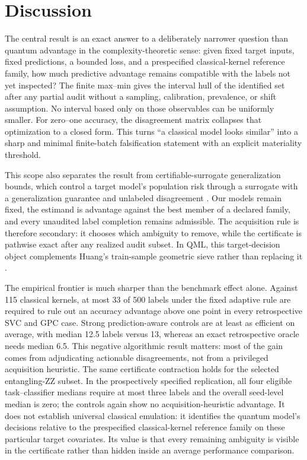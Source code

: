 \documentclass[referee,lineno,pdflatex,sn-nature]{sn-jnl}
\theoremstyle{thmstyleone}%
\theoremstyle{thmstyletwo}%
\theoremstyle{thmstylethree}%
\begin{document}
\section{Discussion}
\label{sec:discussion}

The central result is an exact answer to a deliberately narrower question than quantum advantage in the complexity-theoretic sense: given fixed target inputs, fixed predictions, a bounded loss, and a prespecified classical-kernel reference family, how much predictive advantage remains compatible with the labels not yet inspected? The finite max--min gives the interval hull of the identified set after any partial audit without a sampling, calibration, prevalence, or shift assumption. No interval based only on those observables can be uniformly smaller. For zero--one accuracy, the disagreement matrix collapses that optimization to a closed form. This turns ``a classical model looks similar'' into a sharp and minimal finite-batch falsification statement with an explicit materiality threshold.

This scope also separates the result from certifiable-surrogate generalization bounds, which control a target model's population risk through a surrogate with a generalization guarantee and unlabeled disagreement \cite{bazinet2026bound}. Our models remain fixed, the estimand is advantage against the best member of a declared family, and every unaudited label completion remains admissible. The acquisition rule is therefore secondary: it chooses which ambiguity to remove, while the certificate is pathwise exact after any realized audit subset. In QML, this target-decision object complements Huang's train-sample geometric sieve rather than replacing it \cite{huang2021powerofdata}.

The empirical frontier is much sharper than the benchmark effect alone. Against 115 classical kernels, at most 33 of 500 labels under the fixed adaptive rule are required to rule out an accuracy advantage above one point in every retrospective SVC and GPC case. Strong prediction-aware controls are at least as efficient on average, with median 12.5 labels versus 13, whereas an exact retrospective oracle needs median 6.5. This negative algorithmic result matters: most of the gain comes from adjudicating actionable disagreements, not from a privileged acquisition heuristic. The same certificate contraction holds for the selected entangling-ZZ subset. In the prospectively specified replication, all four eligible task--classifier medians require at most three labels and the overall seed-level median is zero; the controls again show no acquisition-heuristic advantage. It does not establish universal classical emulation: it identifies the quantum model's decisions relative to the prespecified classical-kernel reference family on these particular target covariates. Its value is that every remaining ambiguity is visible in the certificate rather than hidden inside an average performance comparison.
\end{document}
